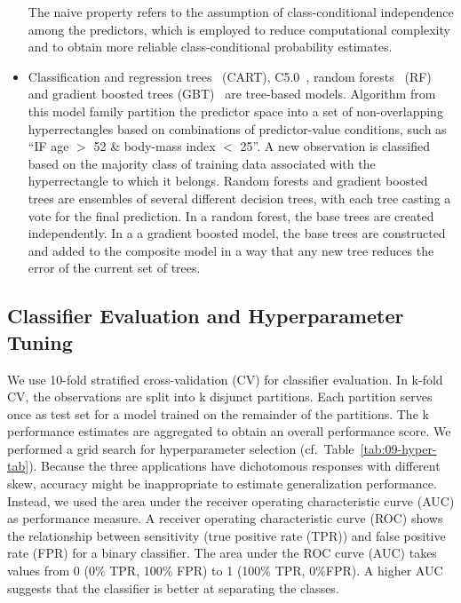 \documentclass[
  oneside]{book}
\begin{document}
\begin{itemize}
  The naive property refers to the assumption of class-conditional independence among the predictors, which is employed to reduce computational complexity and to obtain more reliable class-conditional probability estimates.
\item
  Classification and regression trees~\autocite{BreimanEtAl:CART1984} (CART),
  C5.0~\autocite{Quinlan:C451993},
  random forests~\autocite{Breiman:RandomForests2001} (RF) and
  gradient boosted trees (GBT)~\autocite{Friedman:PDP2001} are tree-based models.
  Algorithm from this model family partition the predictor space into a set of non-overlapping hyperrectangles based on combinations of predictor-value conditions, such as ``IF age \(>\) 52 \& body-mass index \(<\) 25''.
  A new observation is classified based on the majority class of training data associated with the hyperrectangle to which it belongs.
  Random forests and gradient boosted trees are ensembles of several different decision trees, with each tree casting a vote for the final prediction.
  In a random forest, the base trees are created independently.
  In a a gradient boosted model, the base trees are constructed and added to the composite model in a way that any new tree reduces the error of the current set of trees.
\end{itemize}

\hypertarget{classifier-evaluation-and-hyperparameter-tuning}{%
\subsection{Classifier Evaluation and Hyperparameter Tuning}\label{classifier-evaluation-and-hyperparameter-tuning}}

We use 10-fold stratified cross-validation (CV) for classifier evaluation.
In k-fold CV, the observations are split into k disjunct partitions.
Each partition serves once as test set for a model trained on the remainder of the partitions.
The k performance estimates are aggregated to obtain an overall performance score.
We performed a grid search for hyperparameter selection (cf.~Table~\ref{tab:09-hyper-tab}).
Because the three applications have dichotomous responses with different skew, accuracy might be inappropriate to estimate generalization performance.
Instead, we used the area under the receiver operating characteristic curve (AUC) as performance measure.
A receiver operating characteristic curve (ROC) shows the relationship between sensitivity (true positive rate (TPR)) and false positive rate (FPR) for a binary classifier.
The area under the ROC curve (AUC) takes values from 0 (0\% TPR, 100\% FPR) to 1 (100\% TPR, 0\%FPR).
A higher AUC suggests that the classifier is better at separating the classes.
\end{document}
